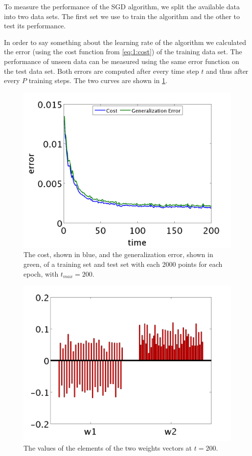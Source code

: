 To measure the performance of the SGD algorithm, we split the available data into two data sets. The first set we use to train the algorithm and the other to test its performance. 

In order to say something about the learning rate of the algorithm we calculated the error (using the cost function from \eqref{eq:1:cost}) of the training data set. The performance of unseen data can be measured using the same error function on the test data set. Both errors are computed after every time step $t$ and thus after every $P$ training steps. The two curves are shown in \cref{fig:exp:errors}.

\begin{figure}
	\centering
	\includegraphics[width=\columnwidth]{./img/errors_train_2000_test_2000.png}
	\caption{The cost, shown in blue, and the generalization error, shown in green, of a training set and test set with each 2000 points for each epoch, with $t_{max} = 200$.}
	\label{fig:exp:errors}
\end{figure}

\begin{figure}
	\centering
	\includegraphics[width=\columnwidth]{./img/weights_train_2000_test_2000.png}
	\caption{The values of the elements of the two weights vectors at $t = 200$.}
	\label{fig:exp:weights}
\end{figure}